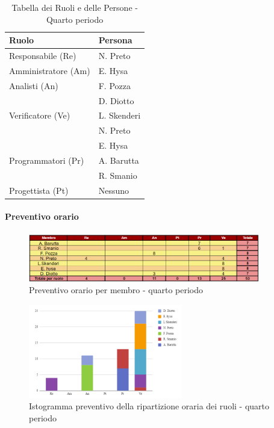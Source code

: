 \begin{table}[H]
    \centering
    \begin{tabular}{|l|l|}
    \hline
    \textbf{Ruolo} & \textbf{Persona} \\
    \hline
    \hline
    Responsabile (Re) & N. Preto \\
    \hline
    Amministratore (Am) & E. Hysa \\
    \hline
    Analisti (An)   & F. Pozza \\
                    & D. Diotto \\
    \hline
    Verificatore (Ve)   & L. Skenderi \\
                        & N. Preto \\
                        & E. Hysa \\
     \hline
    Programmatori (Pr)  & A. Barutta \\
                        & R. Smanio \\
    \hline
    Progettista (Pt) & Nessuno \\
    \hline
    \end{tabular}
    \caption{Tabella dei Ruoli e delle Persone - Quarto periodo}
    \label{tab:Ruoli_persone_4}
    \end{table}
    

\paragraph*{Preventivo orario} \hspace{1pt}

\begin{figure}[H]
    \centering
    \includegraphics[width=0.9\textwidth]{../Images/preventivoOrario4Periodo.png}
    \caption{Preventivo orario per membro - quarto periodo}
    \label{fig:Preventivo_orario_4}
\end{figure}

\begin{figure}[H]
    \centering
    \includegraphics[width=0.6\textwidth]{../Images/preventivoDivisioneRuoli4Periodo.png}
    \caption{Istogramma preventivo della ripartizione oraria dei ruoli - quarto periodo}
    \label{fig:Preventivo_ripartizione_oraria_4}
\end{figure}

